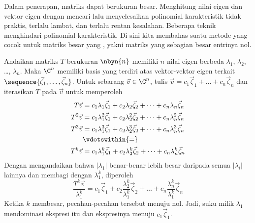 Dalam penerapan, matriks dapat berukuran besar. Menghitung nilai eigen dan
vektor eigen dengan mencari lalu menyelesaikan polinomial karakteristik tidak
praktis, terlalu lambat, dan terlalu rentan kesalahan. Beberapa teknik
menghindari polinomial karakteristik. Di sini kita membahas suatu metode yang
cocok untuk matriks besar yang %
, yakni matriks yang sebagian besar entrinya nol.

Andaikan matriks $T$ berukuran $\nbyn{n}$ memiliki $n$ nilai eigen berbeda
$\lambda_1$, $\lambda_2$, \ldots, $\lambda_n$. Maka $\C^n$ memiliki basis yang
terdiri atas vektor-vektor eigen terkait
$\sequence{\vec{\zeta}_1,\dots,\vec{\zeta}_n}$. Untuk sebarang
$\vec{v}\in\C^n$, tulis
$\vec{v}=c_1\vec{\zeta}_1+\dots+c_n\vec{\zeta}_n$ dan iterasikan $T$ pada
$\vec{v}$ untuk memperoleh
\begin{align*}
  T\vec{v} 
      &=c_1\lambda_1\vec{\zeta}_1+c_2\lambda_2\vec{\zeta}_2+
                              \dots+c_n\lambda_n\vec{\zeta}_n  \\
  T^2\vec{v} 
      &=c_1\lambda_1^2\vec{\zeta}_1+c_2\lambda_2^2\vec{\zeta}_2+
                              \dots+c_n\lambda_n^2\vec{\zeta}_n  \\
  T^3\vec{v} 
      &=c_1\lambda_1^3\vec{\zeta}_1+c_2\lambda_2^3\vec{\zeta}_2+
                              \dots+c_n\lambda_n^3\vec{\zeta}_n  \\
      &\vdotswithin{=}                                            \\
  T^k\vec{v} 
      &=c_1\lambda_1^k\vec{\zeta}_1+c_2\lambda_2^k\vec{\zeta}_2+
                              \dots+c_n\lambda_n^k\vec{\zeta}_n  
\end{align*}
Dengan mengandaikan bahwa $|\lambda_1|$ benar-benar lebih besar daripada
semua $|\lambda_i|$ lainnya dan membagi dengan $\lambda_1^k$, diperoleh
\begin{equation*}
  \frac{T^k\vec{v}}{\lambda_1^k} 
      =c_1\vec{\zeta}_1+c_2\frac{\lambda_2^k}{\lambda_1^k}\vec{\zeta}_2+
                    \dots+c_n\frac{\lambda_n^k}{\lambda_1^k}\vec{\zeta}_n  
\end{equation*} 
Ketika $k$ membesar, pecahan-pecahan tersebut menuju nol. Jadi, suku milik
$\lambda_1$ mendominasi ekspresi itu dan ekspresinya menuju
$c_1\vec{\zeta}_1$.

